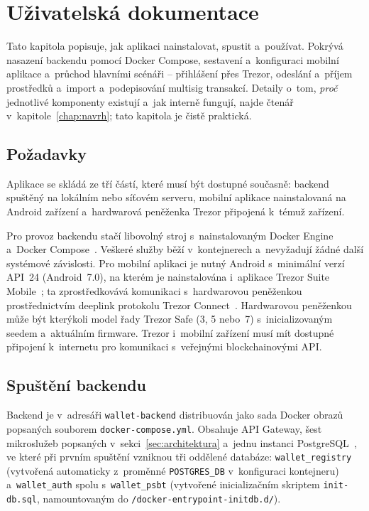 
\chapter{Uživatelská dokumentace}
\label{chap:uzivatelska}

Tato kapitola popisuje, jak aplikaci nainstalovat, spustit a~používat. Pokrývá
nasazení backendu pomocí Docker Compose, sestavení a~konfiguraci mobilní
aplikace a~průchod hlavními scénáři -- přihlášení přes Trezor, odeslání
a~příjem prostředků a~import a~podepisování multisig transakcí. Detaily
o~tom, \emph{proč} jednotlivé komponenty existují a~jak interně fungují,
najde čtenář v~kapitole~\ref{chap:navrh}; tato kapitola je čistě praktická.

\section{Požadavky}
\label{sec:user-pozadavky}

Aplikace se skládá ze tří částí, které musí být dostupné současně: backend
spuštěný na lokálním nebo síťovém serveru, mobilní aplikace nainstalovaná na
Android zařízení a~hardwarová peněženka Trezor připojená k~témuž zařízení.

Pro provoz backendu stačí libovolný stroj s~nainstalovaným Docker
Engine a~Docker Compose~\cite{Docker}. Veškeré služby běží v~kontejnerech
a~nevyžadují žádné další systémové závislosti. Pro mobilní aplikaci je
nutný Android s~minimální verzí API~24 (Android~7.0), na kterém je
nainstalována i~aplikace Trezor Suite Mobile~\cite{TrezorSuite}; ta
zprostředkovává komunikaci s~hardwarovou peněženkou prostřednictvím
deeplink protokolu Trezor Connect~\cite{TrezorConnect}. Hardwarovou
peněženkou může být kterýkoli model řady Trezor Safe (3, 5 nebo~7)
s~inicializovaným seedem a~aktuálním firmware. Trezor i~mobilní zařízení
musí mít dostupné připojení k~internetu pro komunikaci s~veřejnými
blockchainovými API.

\section{Spuštění backendu}
\label{sec:user-backend}

Backend je v~adresáři \texttt{wallet-backend} distribuován jako sada Docker
obrazů popsaných souborem \texttt{docker-compose.yml}. Obsahuje API Gateway,
šest mikroslužeb popsaných v~sekci~\ref{sec:architektura} a~jednu instanci
PostgreSQL~\cite{PostgreSQL}, ve které při prvním spuštění vzniknou
tři oddělené databáze: \texttt{wallet\_registry} (vytvořená automaticky
z~proměnné \texttt{POSTGRES\_DB} v~konfiguraci kontejneru)
a~\texttt{wallet\_auth} spolu s~\texttt{wallet\_psbt} (vytvořené
inicializačním skriptem \texttt{init-db.sql}, namountovaným do
\texttt{/docker-entrypoint-initdb.d/}).

